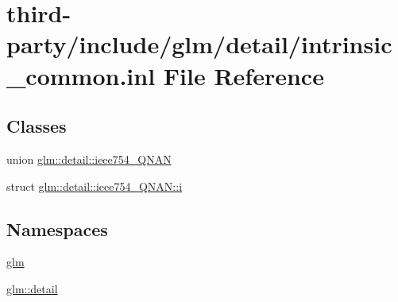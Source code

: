 \hypertarget{intrinsic__common_8inl}{}\section{third-\/party/include/glm/detail/intrinsic\+\_\+common.inl File Reference}
\label{intrinsic__common_8inl}
\subsection*{Classes}
\begin{DoxyCompactItemize}
\item 
union \hyperlink{unionglm_1_1detail_1_1ieee754___q_n_a_n}{glm\+::detail\+::ieee754\+\_\+\+Q\+N\+AN}
\item 
struct \hyperlink{structglm_1_1detail_1_1ieee754___q_n_a_n_1_1i}{glm\+::detail\+::ieee754\+\_\+\+Q\+N\+A\+N\+::i}
\end{DoxyCompactItemize}
\subsection*{Namespaces}
\begin{DoxyCompactItemize}
\item 
 \hyperlink{namespaceglm}{glm}
\item 
 \hyperlink{namespaceglm_1_1detail}{glm\+::detail}
\end{DoxyCompactItemize}
